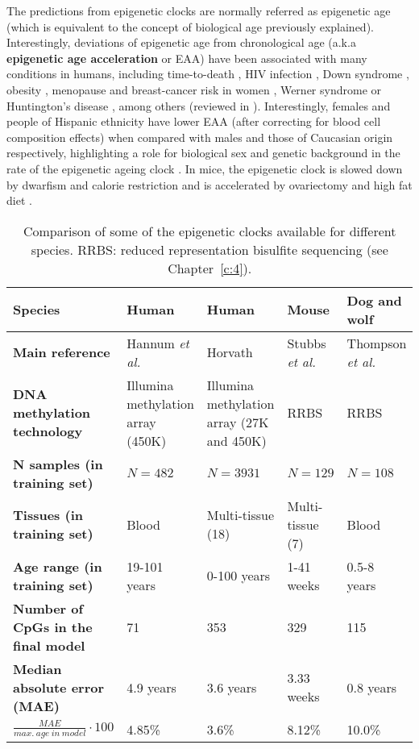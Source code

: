 The predictions from epigenetic clocks are normally referred as epigenetic age (which is equivalent to the concept of biological age previously explained). Interestingly, deviations of epigenetic age from chronological age (a.k.a \textbf{epigenetic age acceleration} or \acrshort{EAA}) have been associated with many conditions in humans, including time-to-death \cite{Chen2016,Marioni2015}, HIV infection \cite{Horvath2015b}, Down syndrome \cite{Horvath2015a}, obesity \cite{Horvath2014}, menopause \cite{Levine2016} and breast-cancer risk in women \cite{Kresovich2019}, Werner syndrome \cite{Maierhofer2017} or Huntington’s disease \cite{Horvath2016a}, among others (reviewed in \cite{Horvath2018}). Interestingly, females and people of Hispanic ethnicity have lower \acrshort{EAA} (after correcting for blood cell composition effects) when compared with males and those of Caucasian origin respectively, highlighting a role for biological sex and genetic background in the rate of the epigenetic ageing clock \cite{Horvath2016}. In mice, the epigenetic clock is slowed down by dwarfism and calorie restriction \cite{Wang2017,Cole2017,Petkovich2017,Thompson2018,Meer2018} and is accelerated by ovariectomy and high fat diet \cite{Wang2017,Stubbs2017, Petkovich2017,Thompson2018}. 

\bigskip

\begin{table}
	\begin{tabular}{p{3.5cm} | p{2.5cm} p{2.5cm} p{2.5cm} p{2.5cm}}
		\toprule 
		\textbf{Species} & Human & Human & Mouse & Dog and wolf \\
		\midrule
		\textbf{Main reference} & Hannum \textit{et al.} \cite{Hannum2013} & Horvath \cite{Horvath2013} & Stubbs \textit{et al.} \cite{Stubbs2017} & Thompson \textit{et al.} \cite{Thompson2017} \\
		\midrule
		\textbf{DNA methylation technology} & Illumina methylation array (450K) & Illumina methylation array (27K and 450K) & RRBS & RRBS \\
		\midrule
		\textbf{N samples (in training set)} & $N=482$ & $N=3931$ & $N=129$ & $N=108$ \\
		\midrule
		\textbf{Tissues (in training set)} & Blood & Multi-tissue (18) & Multi-tissue (7) & Blood \\
		\midrule
		\textbf{Age range (in training set)} & 19-101 years & 0-100 years & 1-41 weeks & 0.5-8 years \\
		\midrule
		\textbf{Number of CpGs in the final model} & 71 & 353 & 329 & 115 \\
		\midrule
		\textbf{Median absolute error (\acrshort{MAE})} & 4.9 years & 3.6 years & 3.33 weeks & 0.8 years \\
		\midrule
		$\frac{MAE}{max.\ age\ in\ model} \cdot 100$ & 4.85\% & 3.6\% & 8.12\% & 10.0\% \\    
		\bottomrule 
	\end{tabular}
	\vspace*{3mm}
	\caption[Comparison of epigenetic clocks in different species]{Comparison of some of the epigenetic clocks available for different species. \acrshort{RRBS}: reduced representation bisulfite sequencing (see Chapter~\ref{c:4}).}
	\label{tab:clocks}
\end{table}  


